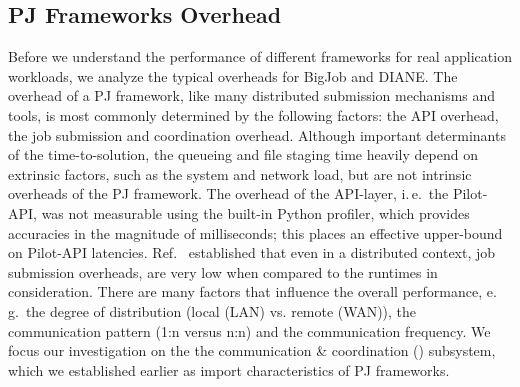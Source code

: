 \documentclass[conference]{IEEEtran}
\begin{document}








\subsection{PJ Frameworks Overhead}\label{sec:pj_performance}

Before we understand the performance of different frameworks for real
application workloads, we analyze the typical overheads for BigJob and
DIANE.  The overhead of a PJ framework, like many distributed
submission mechanisms and tools, is most commonly determined by the
following factors: the API overhead, the job submission and
coordination overhead. Although important determinants of the
time-to-solution, the queueing and file staging time heavily depend on
extrinsic factors, such as the system and network load, but are not
intrinsic overheads of the PJ framework. The overhead of the
API-layer, i.\,e.\ the Pilot-API, was not measurable using the
built-in Python profiler, which provides accuracies in the magnitude
of milliseconds; this places an effective upper-bound on Pilot-API
latencies. Ref.~\cite{saga_europar10-short} established that even in a
distributed context, job submission overheads, are very low when
compared to the runtimes in consideration.  There are many factors
that influence the overall performance, e.\,g.\ the
degree of distribution (local (LAN) vs. remote (WAN)), the
communication pattern (1:n versus n:n) and the communication
frequency. We focus our investigation on the the communication \& 
coordination (\cc) subsystem, which we established earlier as
import characteristics of PJ frameworks.
\end{document}
